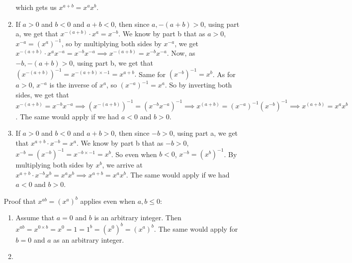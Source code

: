 \documentclass{article}
\begin{document}
\begin{enumerate}[label=\textbf{\alph*.}]
\begin{enumerate}[label=\textbf{case \arabic*:}]
                    which gets us $x^{a+b} = x^ax^b$.
                \item
                    If $a > 0$ and $b < 0$ and $a + b < 0$,
                    then since $a, -(a+b) > 0$, using part a,
                    we get that $x^{-(a+b)} \cdot x^{a} = x^{-b}$.
                    We know by part b that as $a > 0$, $x^{-a} = (x^{a})^{-1}$,
                    so by multiplying both sides by $x^{-a}$,
                    we get $x^{-(a+b)} \cdot x^{a}x^{-a} = x^{-b}x^{-a}
                    \implies x^{-(a+b)} = x^{-b}x^{-a}$.
                    Now, as $-b, -(a+b) > 0$, using part b, we get that
                    $(x^{-(a+b)})^{-1} = x^{-(a+b) \times -1} = x^{a+b}.$
                    Same for $(x^{-b})^{-1} = x^b$.
                    As for $a > 0$, $x^{-a}$ is the inverse of $x^{a}$,
                    so $(x^{-a})^{-1} = x^a$.
                    So by inverting both sides,
                    we get that $x^{-(a+b)} = x^{-b}x^{-a}
                    \implies (x^{-(a+b)})^{-1} = (x^{-b}x^{-a})^{-1}
                    \implies x^{(a+b)} = (x^{-a})^{-1}(x^{-b})^{-1}
                    \implies x^{(a+b)} = x^{a}x^{b}$.
                    The same would apply if we had $a < 0$ and $b > 0$.
                \item
                    If $a > 0$ and $b < 0$ and $a + b > 0$,
                    then since $-b > 0$, using part a,
                    we get that $x^{a+b} \cdot x^{-b} = x^{a}$.
                    We know by part b that as $-b > 0$, $x^{-b}
                    = (x^{-b})^{-1} = x^{-b \times -1} = x^{b}$.
                    So even when $b < 0$, $x^{-b} = (x^{b})^{-1}$. 
                    By multiplying both sides by $x^{b}$,
                    we arrive at $x^{a+b} \cdot x^{-b}x^{b} = x^{a}x^{b}
                    \implies x^{a+b} = x^{a}x^{b}$.
                    The same would apply if we had $a < 0$ and $b > 0$.
            \end{enumerate}
            Proof that $x^{ab} = (x^a)^b$ applies even when $a, b \leqslant 0$:
            \begin{enumerate}[label=\textbf{case \arabic*:}]
                \item
                    Assume that $a = 0$ and $b$ is an arbitrary integer.
                    Then $x^{ab} = x^{0 \times b}
                    = x^{0} = 1 = 1^b = (x^{0})^{b}
                    = (x^{a})^{b}$.
                    The same would apply for $b = 0$
                    and $a$ as an arbitrary integer.
                \item

\end{enumerate}
\end{enumerate}
\end{document}
